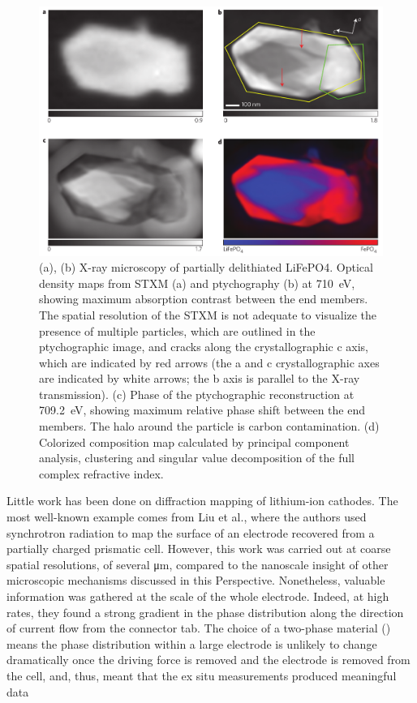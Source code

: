 \documentclass[journal=cmatex,manuscript=perspective]{achemso}
\begin{document}
\begin{figure}
  \includegraphics[width=\textwidth]{shapiro2014-2.png}
  \caption{(a), (b) X-ray microscopy of partially delithiated
    LiFePO4. Optical density maps from STXM (a) and ptychography (b)
    at \SI{710}{eV}, showing maximum absorption contrast between the end
    members. The spatial resolution of the STXM is not adequate to
    visualize the presence of multiple particles, which are outlined
    in the ptychographic image, and cracks along the crystallographic
    c axis, which are indicated by red arrows (the a and c
    crystallographic axes are indicated by white arrows; the b axis is
    parallel to the X-ray transmission). (c) Phase of the
    ptychographic reconstruction at \SI{709.2}{eV}, showing maximum relative
    phase shift between the end members. The halo around the particle
    is carbon contamination. (d) Colorized composition map calculated
    by principal component analysis, clustering and singular value
    decomposition of the full complex refractive index.\cite{shapiro2014}}
  \label{figure:shapiro2014-2}
\end{figure}
Little work has been done on diffraction mapping of lithium-ion
cathodes. The most well-known example comes from Liu et
al.\cite{liu2010}, where the authors used synchrotron radiation to map
the surface of an electrode recovered from a partially charged
prismatic cell. However, this work was carried out at coarse spatial
resolutions, of several \si{\micro\meter}, compared to the nanoscale
insight of other microscopic mechanisms discussed in this
Perspective. Nonetheless, valuable information was gathered at the
scale of the whole electrode. Indeed, at high rates, they found a
strong gradient in the phase distribution along the direction of
current flow from the connector tab. The choice of a two-phase
material () means the phase distribution within a large
electrode is unlikely to change dramatically once the driving force is
removed and the electrode is removed from the cell, and, thus, meant
that the ex situ measurements produced meaningful data
\end{document}
